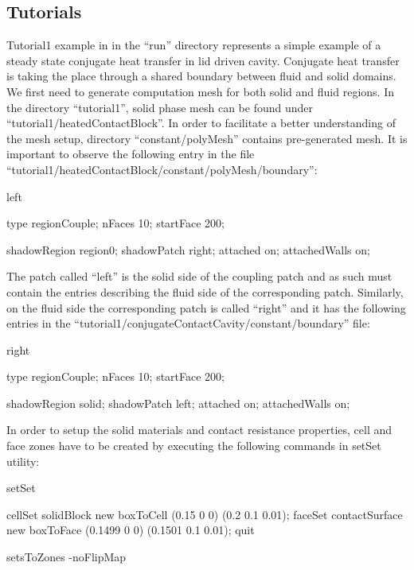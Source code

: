 \subsection*{Tutorials}
Tutorial1 example in in the ``run'' directory represents a simple
example of a steady state conjugate heat transfer in lid driven
cavity. Conjugate heat transfer is taking the place through a shared
boundary between fluid and solid domains. We first need to generate
computation mesh for both solid and fluid regions. In the directory
``tutorial1'', solid phase mesh can be found under
``tutorial1/heatedContactBlock''. In order to facilitate a better
understanding of the mesh setup, directory ``constant/polyMesh''
contains pre-generated mesh. It is important to observe the following
entry in the file\\
``tutorial1/heatedContactBlock/constant/polyMesh/boundary'':

\begin{verbQuoteSmall}
left
{
    type regionCouple;
    nFaces 10;
    startFace 200;

    shadowRegion    region0;
    shadowPatch     right;
    attached        on;
    attachedWalls   on;
}
\end{verbQuoteSmall}

The patch called ``left'' is the solid side of the coupling patch and
as such must contain the entries describing the fluid side of the
corresponding patch. Similarly, on the fluid side the corresponding
patch is called ``right'' and it has the following entries in the
``tutorial1/conjugateContactCavity/constant/boundary'' file:

\begin{verbQuoteSmall}
right
{
    type regionCouple;
    nFaces 10;
    startFace 200;

    shadowRegion    solid;
    shadowPatch     left;
    attached        on;
    attachedWalls   on;
}
\end{verbQuoteSmall}

In order to setup the solid materials and contact resistance
properties, cell and face zones have to be created by executing the
following commands in setSet utility:

\begin{verbQuoteSmall}
setSet

cellSet solidBlock new boxToCell (0.15 0 0) (0.2 0.1 0.01);
faceSet contactSurface new boxToFace (0.1499 0 0) (0.1501 0.1 0.01);
quit

setsToZones -noFlipMap
\end{verbQuoteSmall}

